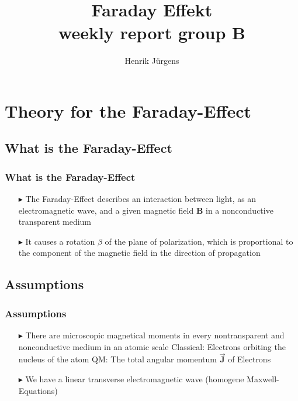\documentclass[11pt,a4paper]{beamer}
\author{Henrik Jürgens}
\title{\textbf{Faraday Effekt}\\ weekly report group B}
\begin{document}
\maketitle
\frame{\tableofcontents}
 \section{Theory for the Faraday-Effect}
\begin{frame} %
\subsection{What is the Faraday-Effect}
  \frametitle{What is the Faraday-Effect} %
  \begin{enumerate}
  \item[$\blacktriangleright$]
  	The Faraday-Effect describes an interaction between light, as an electromagnetic wave, and a given magnetic field \textbf{B} in a nonconductive transparent medium
  \newline
  \item[$\blacktriangleright$]
    It causes a rotation $\beta$ of the plane of polarization, which is proportional to the component of the magnetic field in the direction of propagation
  \end{enumerate}
\end{frame}
\begin{frame}
\subsection{Assumptions}
\frametitle{Assumptions}
\begin{enumerate}
\item[$\blacktriangleright$]
There are microscopic magnetical moments in every nontransparent and nonconductive medium in an atomic scale\newline\newline
 Classical: Electrons orbiting the nucleus of the atom\newline
 QM: The total angular momentum $\vec{\textbf{J}}$ of Electrons\newline
\item[$\blacktriangleright$]
We have a linear transverse electromagnetic wave (homogene Maxwell-Equations)
  
\end{enumerate}
\end{frame}
\end{document}
